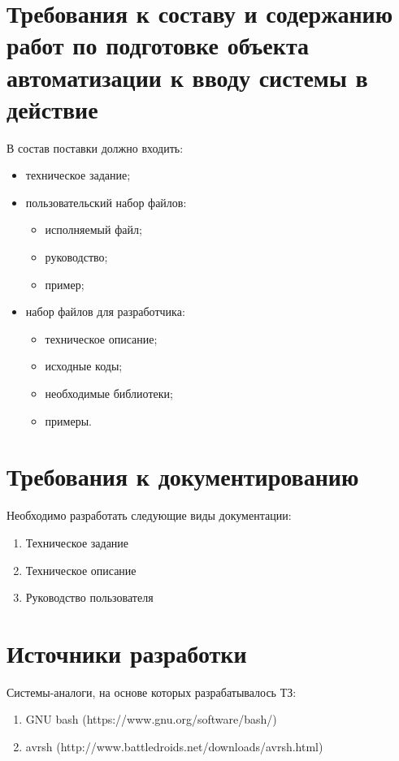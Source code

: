 \documentclass[a4paper, 12pt]{report}
\begin{document}
\section{Требования к составу и содержанию работ по подготовке объекта автоматизации к вводу системы в действие}
В состав поставки должно входить:
\begin{itemize}
	\item техническое задание;
	\item пользовательский набор файлов:
		\begin{itemize}
			\item исполняемый файл;
			\item руководство;
			\item пример;
		\end{itemize}
	\item набор файлов для разработчика:
		\begin{itemize}
			\item техническое описание;
			\item исходные коды;
			\item необходимые библиотеки;
			\item примеры.
		\end{itemize}
\end{itemize}

\section{Требования к документированию}

Необходимо разработать следующие виды документации:
\begin{enumerate}
\item Техническое задание
\item Техническое описание
\item Руководство пользователя
\end{enumerate}

\section{Источники разработки}

Системы-аналоги, на основе которых разрабатывалось ТЗ:
\begin{enumerate}
	\item GNU bash (https://www.gnu.org/software/bash/)
	\item avrsh (http://www.battledroids.net/downloads/avrsh.html)
\end{enumerate}
\end{document}
